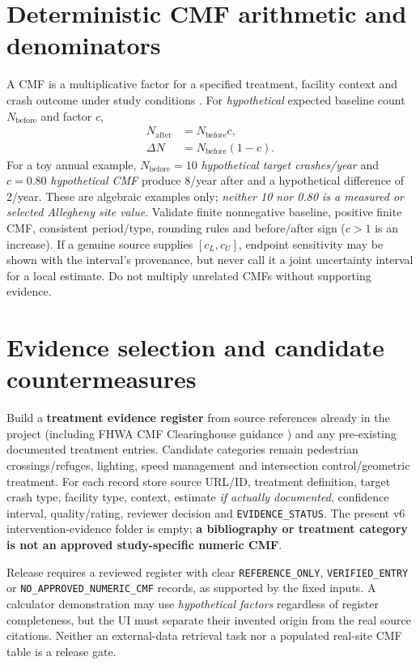 \documentclass[11pt,a4paper,openany]{report}
\newcommand{\pathcode}[1]{\nolinkurl{#1}}
\begin{document}
\section{Deterministic CMF arithmetic and denominators}
A CMF is a multiplicative factor for a specified treatment, facility context and crash outcome under study conditions \cite{CMF}. For \emph{hypothetical} expected baseline count \(N_{\mathrm{before}}\) and factor \(c\),
\begin{align}
N_{\mathrm{after}} &= N_{\mathrm{before}}c,\\
\Delta N &= N_{\mathrm{before}}(1-c).
\end{align}
For a toy annual example, \(N_{\mathrm{before}}=10\) \emph{hypothetical target crashes/year} and \(c=0.80\) \emph{hypothetical CMF} produce 8/year after and a hypothetical difference of 2/year. These are algebraic examples only; \emph{neither 10 nor 0.80 is a measured or selected Allegheny site value}. Validate finite nonnegative baseline, positive finite CMF, consistent period/type, rounding rules and before/after sign (\(c>1\) is an increase). If a genuine source supplies \([c_L,c_U]\), endpoint sensitivity may be shown with the interval's provenance, but never call it a joint uncertainty interval for a local estimate. Do not multiply unrelated CMFs without supporting evidence.

\section{Evidence selection and candidate countermeasures}
Build a \textbf{treatment evidence register} from source references already in the project (including FHWA CMF Clearinghouse guidance \cite{CMF}) and any pre-existing documented treatment entries. Candidate categories remain pedestrian crossings/refuges, lighting, speed management and intersection control/geometric treatment. For each record store source URL/ID, treatment definition, target crash type, facility type, context, estimate \emph{if actually documented}, confidence interval, quality/rating, reviewer decision and \pathcode{EVIDENCE_STATUS}. The present v6 intervention-evidence folder is empty; \textbf{a bibliography or treatment category is not an approved study-specific numeric CMF}.

Release requires a reviewed register with clear \pathcode{REFERENCE_ONLY}, \pathcode{VERIFIED_ENTRY} or \pathcode{NO_APPROVED_NUMERIC_CMF} records, as supported by the fixed inputs. A calculator demonstration may use \emph{hypothetical factors} regardless of register completeness, but the UI must separate their invented origin from the real source citations. Neither an external-data retrieval task nor a populated real-site CMF table is a release gate.
\end{document}

